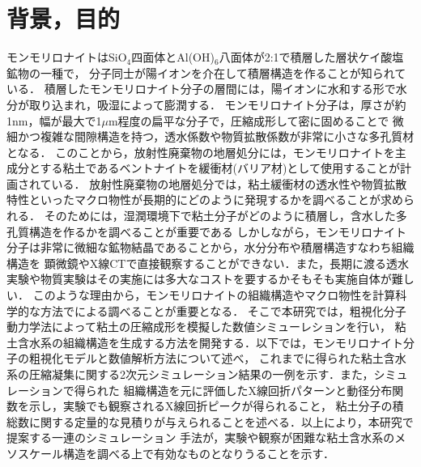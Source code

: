 ﻿\documentclass[11pt,a4j]{jarticle}
\begin{document}
\section{背景，目的}
モンモリロナイトはSiO$_4$四面体とAl(OH)$_6$八面体が2:1で積層した層状ケイ酸塩鉱物の一種で，
分子同士が陽イオンを介在して積層構造を作ることが知られている．
積層したモンモリロナイト分子の層間には，陽イオンに水和する形で水分が取り込まれ，吸湿によって膨潤する．
モンモリロナイト分子は，厚さが約1nm，幅が最大で1$\mu$m程度の扁平な分子で，圧縮成形して密に固めることで
微細かつ複雑な間隙構造を持つ，透水係数や物質拡散係数が非常に小さな多孔質材となる．
このことから，放射性廃棄物の地層処分には，モンモリロナイトを主成分とする粘土であるベントナイトを緩衝材(バリア材)として使用することが計画されている．
放射性廃棄物の地層処分では，粘土緩衝材の透水性や物質拡散特性といったマクロ物性が長期的にどのように発現するかを調べることが求められる．
そのためには，湿潤環境下で粘土分子がどのように積層し，含水した多孔質構造を作るかを調べることが重要である
しかしながら，モンモリロナイト分子は非常に微細な鉱物結晶であることから，水分分布や積層構造すなわち組織構造を
顕微鏡やX線CTで直接観察することができない．また，長期に渡る透水実験や物質実験はその実施には多大なコストを要するかそもそも実施自体が難しい．
このような理由から，モンモリロナイトの組織構造やマクロ物性を計算科学的な方法でによる調べることが重要となる．
そこで本研究では，粗視化分子動力学法によって粘土の圧縮成形を模擬した数値シミューレションを行い，
粘土含水系の組織構造を生成する方法を開発する．以下では，モンモリロナイト分子の粗視化モデルと数値解析方法について述べ，
これまでに得られた粘土含水系の圧縮凝集に関する2次元シミュレーション結果の一例を示す．また，シミュレーションで得られた
組織構造を元に評価したX線回折パターンと動径分布関数を示し，実験でも観察されるX線回折ピークが得られること，
粘土分子の積総数に関する定量的な見積りが与えられることを述べる．以上により，本研究で提案する一連のシミュレーション
手法が，実験や観察が困難な粘土含水系のメソスケール構造を調べる上で有効なものとなりうることを示す．
\end{document}
